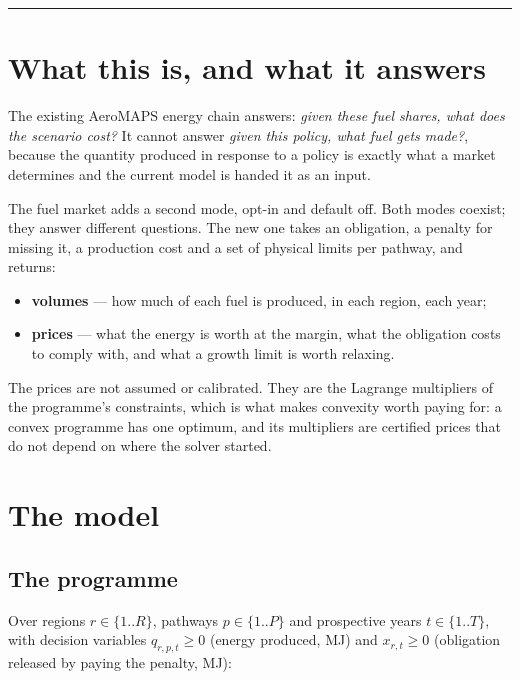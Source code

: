 \documentclass[11pt,a4paper]{article}
\begin{document}
\tableofcontents

\vspace{4mm}
\hrule
\vspace{4mm}

\section{What this is, and what it answers}

The existing AeroMAPS energy chain answers: \emph{given these fuel shares, what does the
scenario cost?} It cannot answer \emph{given this policy, what fuel gets made?}, because
the quantity produced in response to a policy is exactly what a market determines and
the current model is handed it as an input.

The fuel market adds a second mode, opt-in and default off. Both modes coexist; they
answer different questions. The new one takes an obligation, a penalty for missing it,
a production cost and a set of physical limits per pathway, and returns:

\begin{itemize}[nosep,leftmargin=*]
  \item \textbf{volumes} --- how much of each fuel is produced, in each region, each year;
  \item \textbf{prices} --- what the energy is worth at the margin, what the obligation
        costs to comply with, and what a growth limit is worth relaxing.
\end{itemize}

The prices are not assumed or calibrated. They are the Lagrange multipliers of the
programme's constraints, which is what makes convexity worth paying for: a convex
programme has one optimum, and its multipliers are certified prices that do not depend
on where the solver started.

\section{The model}
\label{sec:model}

\subsection{The programme}

Over regions $r \in \{1..R\}$, pathways $p \in \{1..P\}$ and prospective years
$t \in \{1..T\}$, with decision variables $q_{r,p,t} \ge 0$ (energy produced, MJ) and
$x_{r,t} \ge 0$ (obligation released by paying the penalty, MJ):
\end{document}
